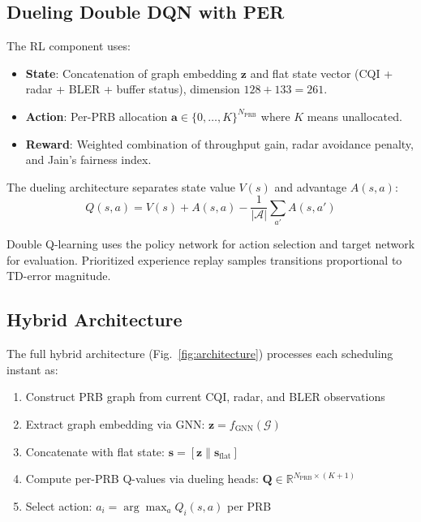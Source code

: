 \documentclass[conference]{IEEEtran}
\begin{document}
\subsection{Dueling Double DQN with PER}

The RL component uses:
\begin{itemize}
    \item \textbf{State}: Concatenation of graph embedding $\mathbf{z}$ and flat state vector (CQI + radar + BLER + buffer status), dimension $128 + 133 = 261$.
    \item \textbf{Action}: Per-PRB allocation $\mathbf{a} \in \{0, \ldots, K\}^{N_{\text{PRB}}}$ where $K$ means unallocated.
    \item \textbf{Reward}: Weighted combination of throughput gain, radar avoidance penalty, and Jain's fairness index.
\end{itemize}

The dueling architecture \cite{wang2016dueling} separates state value $V(s)$ and advantage $A(s, a)$:
\begin{equation}
    Q(s, a) = V(s) + A(s, a) - \frac{1}{|\mathcal{A}|}\sum_{a'} A(s, a')
\end{equation}

Double Q-learning \cite{hasselt2016double} uses the policy network for action selection and target network for evaluation. Prioritized experience replay \cite{schaul2016per} samples transitions proportional to TD-error magnitude.

\subsection{Hybrid Architecture}

The full hybrid architecture (Fig.~\ref{fig:architecture}) processes each scheduling instant as:
\begin{enumerate}
    \item Construct PRB graph from current CQI, radar, and BLER observations
    \item Extract graph embedding via GNN: $\mathbf{z} = f_{\text{GNN}}(\mathcal{G})$
    \item Concatenate with flat state: $\mathbf{s} = [\mathbf{z} \| \mathbf{s}_{\text{flat}}]$
    \item Compute per-PRB Q-values via dueling heads: $\mathbf{Q} \in \mathbb{R}^{N_{\text{PRB}} \times (K+1)}$
    \item Select action: $a_i = \arg\max_a Q_i(s, a)$ per PRB
\end{enumerate}
\end{document}
